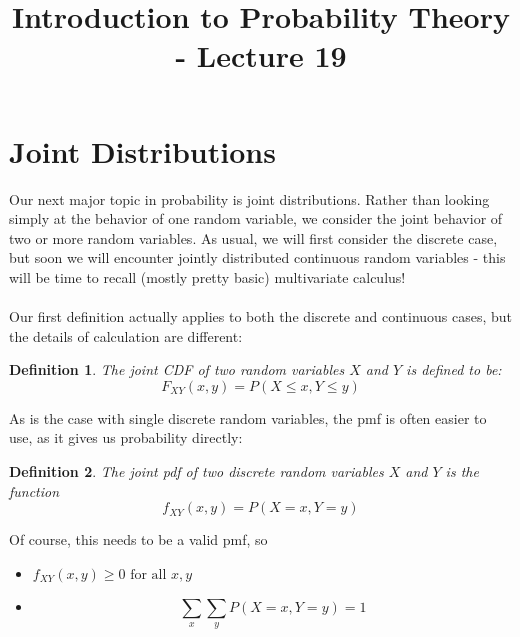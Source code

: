 \documentclass[12pt]{article} %
\date{}
\title{Introduction to Probability Theory - Lecture 19}
\newtheorem{defn}{Definition}
\begin{document}
\maketitle

\section{Joint Distributions}
Our next major topic in probability is joint distributions. Rather than looking simply at the behavior of one random variable, we consider the joint behavior of two or more random variables. As usual, we will first consider the discrete case, but soon we will encounter jointly distributed continuous random variables - this will be time to recall (mostly pretty basic) multivariate calculus!\\\\
Our first definition actually applies to both the discrete and continuous cases, but the details of calculation are different:

\begin{defn}
The joint CDF of two random variables $X$ and $Y$ is defined to be:
$$F_{XY}(x,y) = P(X\leq x, Y\leq y)$$
\end{defn}

As is the case with single discrete random variables, the pmf is often easier to use, as it gives us probability directly:

\begin{defn}
The joint pdf of two discrete random variables $X$ and $Y$ is the function 
$$f_{XY}(x,y) = P(X=x,Y=y)$$
\end{defn}
Of course, this needs to be a valid pmf, so
\begin{itemize}
\item $f_{XY}(x,y)\geq 0 \textrm{ for all } x,y$
\item $$\sum_x\sum_y P(X=x,Y=y) = 1$$
\end{itemize}
\end{document}
